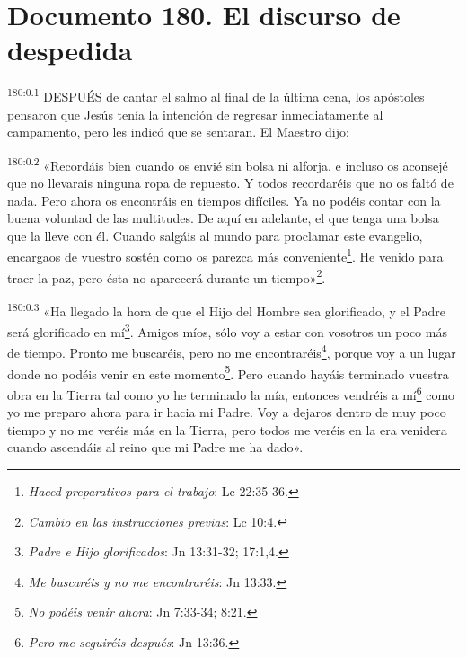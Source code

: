 \chapter{Documento 180. El discurso de despedida}
\par 
\textsuperscript{180:0.1} DESPUÉS de cantar el salmo al final de la última cena, los apóstoles pensaron que Jesús tenía la intención de regresar inmediatamente al campamento, pero les indicó que se sentaran. El Maestro dijo:

\par 
\textsuperscript{180:0.2} «Recordáis bien cuando os envié sin bolsa ni alforja, e incluso os aconsejé que no llevarais ninguna ropa de repuesto. Y todos recordaréis que no os faltó de nada. Pero ahora os encontráis en tiempos difíciles. Ya no podéis contar con la buena voluntad de las multitudes. De aquí en adelante, el que tenga una bolsa que la lleve con él. Cuando salgáis al mundo para proclamar este evangelio, encargaos de vuestro sostén como os parezca más conveniente\footnote{\textit{Haced preparativos para el trabajo}: Lc 22:35-36.}. He venido para traer la paz, pero ésta no aparecerá durante un tiempo»\footnote{\textit{Cambio en las instrucciones previas}: Lc 10:4.}.

\par 
\textsuperscript{180:0.3} «Ha llegado la hora de que el Hijo del Hombre sea glorificado, y el Padre será glorificado en mí\footnote{\textit{Padre e Hijo glorificados}: Jn 13:31-32; 17:1,4.}. Amigos míos, sólo voy a estar con vosotros un poco más de tiempo. Pronto me buscaréis, pero no me encontraréis\footnote{\textit{Me buscaréis y no me encontraréis}: Jn 13:33.}, porque voy a un lugar donde no podéis venir en este momento\footnote{\textit{No podéis venir ahora}: Jn 7:33-34; 8:21.}. Pero cuando hayáis terminado vuestra obra en la Tierra tal como yo he terminado la mía, entonces vendréis a mí\footnote{\textit{Pero me seguiréis después}: Jn 13:36.} como yo me preparo ahora para ir hacia mi Padre. Voy a dejaros dentro de muy poco tiempo y no me veréis más en la Tierra, pero todos me veréis en la era venidera cuando ascendáis al reino que mi Padre me ha dado».

